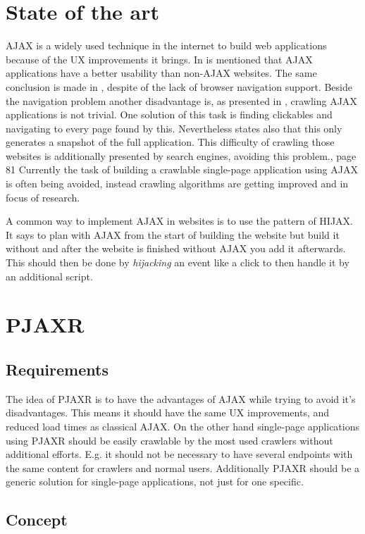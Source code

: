 \documentclass[f,bachelor,binding,twoside,palatino]{WeSTthesis}
\def \ajax {AJAX}
\def \pjaxr {PJAXR}
\def \singlePageApplication {single-page application}
\begin{document}
\section{State of the art}
  \ajax{} is a widely used technique in the internet to build web applications because of the UX improvements it brings.
  In \cite{roodt06} is mentioned that \ajax{} applications have a better usability than non-\ajax{} websites.
  The same conclusion is made in \cite{klugeKarglWeber07}, despite of the lack of browser navigation support.
  Beside the navigation problem another disadvantage is, as presented in \cite{mesbah09}, crawling \ajax{} applications is not trivial.
  One solution of this task is finding clickables and navigating to every page found by this.
  Nevertheless \cite{mesbah09} states also that this only generates a snapshot of the full application.
  This difficulty of crawling those websites is additionally presented by search engines, avoiding this problem.\cite{matter08}, page 81
  Currently the task of building a crawlable \singlePageApplication{} using \ajax{} is often being avoided, instead crawling algorithms are getting improved and in focus of research.

  A common way to implement \ajax{} in websites is to use the pattern of HIJAX.
  It says to plan with \ajax{} from the start of building the website but build it without and after the website is finished without \ajax{} you add it afterwards.
  This should then be done by \emph{hijacking} an event like a click to then handle it by an additional script.

  
\section{\pjaxr{}}
  \subsection{Requirements}
  The idea of \pjaxr{} is to have the advantages of \ajax{} while trying to avoid it's disadvantages.
  This means it should have the same UX improvements, and reduced load times as classical \ajax{}.
  On the other hand \singlePageApplication{}s using \pjaxr{} should be easily crawlable by the most used crawlers without additional efforts.
  E.g. it should not be necessary to have several endpoints with the same content for crawlers and normal users.
  Additionally \pjaxr{} should be a generic solution for \singlePageApplication{}s, not just for one specific.

  \subsection{Concept}
\end{document}
